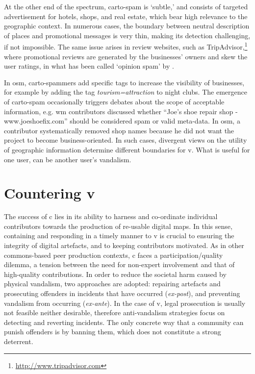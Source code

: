 \documentclass{article} \usepackage{graphicx,xspace}
\newcommand{\footurl}[1]{\footnote{\url{#1}}}
\begin{document}
At the other end of the spectrum, carto-spam is `subtle,' and consists of targeted advertisement for hotels, shops, and real estate, which bear high relevance to the geographic context.
In numerous cases, the boundary between neutral description of places and promotional messages is very thin, making its detection challenging, if not impossible.
The same issue arises in review websites, such as TripAdvisor,\footurl{http://www.tripadvisor.com} where promotional reviews are generated by the businesses' owners and skew the user ratings, in what has been called `opinion spam' by \cite{jindal:2008:opinionspam}.

In \gls{osm}, carto-spammers add specific tags to increase the visibility of businesses, for example by adding the tag \emph{tourism=attraction} to night clubs.
The emergence of carto-spam occasionally triggers debates about the scope of acceptable information, e.g. \gls{wm} contributors discussed whether ``Joe's shoe repair shop - www.joeshoefix.com'' should be considered spam or valid meta-data.
In \gls{osm}, a contributor systematically removed shop names because he did not want the project to become business-oriented.
In such cases, divergent views on the utility of geographic information determine different boundaries for \gls{v}.
What is useful for one user, can be another user's vandalism. 



\section{Countering \protect\gls{v}}
\label{sec:counterv}

The success of \gls{c} lies in its ability to harness and co-ordinate individual contributors towards the production of re-usable digital maps.
In this sense, containing and responding in a timely manner to \gls{v} is crucial to ensuring the integrity of digital artefacts, and to keeping contributors motivated. 
As in other commons-based peer production contexts, \gls{c} faces a participation/quality dilemma, a tension between the need for non-expert involvement and that of high-quality contributions.
In order to reduce the societal harm caused by physical vandalism, two approaches are adopted: repairing artefacts and prosecuting offenders in incidents that have occurred (\emph{ex-post}), and preventing vandalism from occurring (\emph{ex-ante}).
In the case of \gls{v}, legal prosecution is usually not feasible neither desirable, therefore anti-vandalism strategies focus on detecting and reverting incidents.
The only concrete way that a community can punish offenders is by banning them, which does not constitute a strong deterrent.
\end{document}
